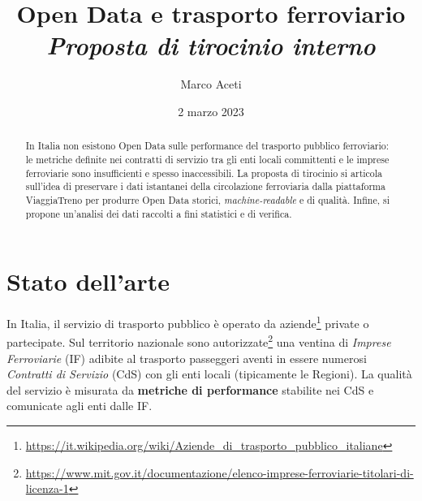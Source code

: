 \documentclass[italian,11pt,a4paper,final]{article}
\date{2 marzo 2023}
\author{Marco Aceti}
\title{
	Open Data e trasporto ferroviario \\
	\textit{\small{Proposta di tirocinio interno}}
}
\begin{document}
	\maketitle

	\begin{abstract}
		In Italia non esistono Open Data sulle performance del trasporto pubblico ferroviario: le metriche definite nei contratti di servizio tra gli enti locali committenti e le imprese ferroviarie sono insufficienti e spesso inaccessibili.
		La proposta di tirocinio si articola sull'idea di preservare i dati istantanei della circolazione ferroviaria dalla piattaforma ViaggiaTreno per produrre Open Data storici, \textit{machine-readable} e di qualità.
		Infine, si propone un'analisi dei dati raccolti a fini statistici e di verifica.
	\end{abstract}

	\section{Stato dell'arte}
	In Italia, il servizio di trasporto pubblico è operato da aziende\footnote{\url{https://it.wikipedia.org/wiki/Aziende_di_trasporto_pubblico_italiane}} private o partecipate.
	Sul territorio nazionale sono autorizzate\footnote{\url{https://www.mit.gov.it/documentazione/elenco-imprese-ferroviarie-titolari-di-licenza-1}} una ventina di \textit{Imprese Ferroviarie} (IF) adibite al trasporto passeggeri aventi in essere numerosi \textit{Contratti di Servizio} (CdS) con gli enti locali (tipicamente le Regioni).
	La qualità del servizio è misurata da \textbf{metriche di performance} stabilite nei CdS e comunicate agli enti dalle IF.
\end{document}
